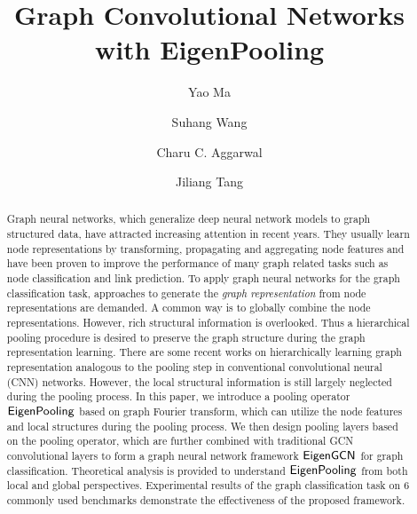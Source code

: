 \documentclass[sigconf]{acmart}
\newcommand{\m}{{\sf {EigenGCN}}}
\newcommand{\pooling}{{\sf {EigenPooling}}}
\begin{document}
\title{Graph Convolutional Networks with EigenPooling}

\author{Yao Ma}



\author{Suhang Wang}


\author{Charu C. Aggarwal}






\author{Jiliang Tang}






















\begin{abstract}
Graph neural networks, which generalize deep neural network models to graph structured data, have attracted increasing attention in recent years. They usually learn node representations by transforming, propagating and aggregating node features and have been proven to improve the performance of many graph related tasks such as node classification and link prediction. To apply graph neural networks for the graph classification task, approaches to generate the \textit{graph representation} from node representations are demanded. A common way is to globally combine the node representations. However, rich structural information is overlooked. Thus a hierarchical pooling procedure is desired to preserve the graph structure during the graph representation learning. There are some recent works on hierarchically learning graph representation analogous to the pooling step in conventional convolutional neural (CNN) networks. However, the local structural information is still largely neglected during the pooling process. In this paper, we introduce a pooling operator $\pooling$ based on graph Fourier transform, which can utilize the node features and local structures during the pooling process. We then design pooling layers based on the pooling operator, which are further combined with traditional GCN convolutional layers to form a graph neural network framework $\m$ for graph classification. Theoretical analysis is provided to understand $\pooling$ from both local and global perspectives. Experimental results of the graph classification task on $6$ commonly used benchmarks demonstrate the effectiveness of the proposed framework. 
\end{abstract}
\end{document}
